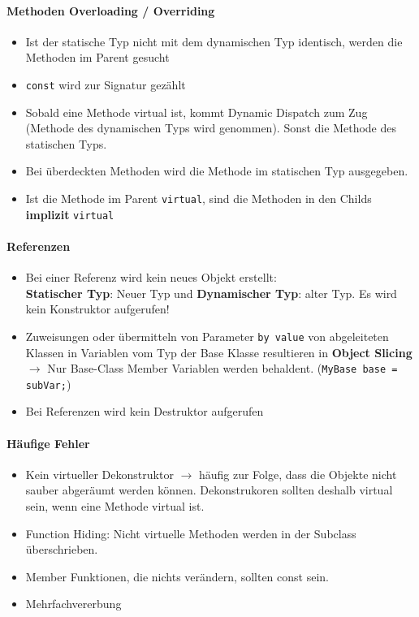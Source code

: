 \paragraph{Methoden Overloading / Overriding}
\begin{itemize}
	\item Ist der statische Typ nicht mit dem dynamischen Typ identisch, werden die Methoden im Parent gesucht
	\item \lstinline|const| wird zur Signatur gezählt
	\item Sobald eine Methode virtual ist, kommt Dynamic Dispatch zum Zug (Methode des dynamischen Typs wird genommen). Sonst die Methode des statischen Typs.
	\item Bei überdeckten Methoden wird die Methode im statischen Typ ausgegeben.
	\item Ist die Methode im Parent \lstinline|virtual|, sind die Methoden in den Childs \textbf{implizit} \lstinline|virtual|
\end{itemize}

\paragraph{Referenzen}
\begin{itemize}
	\item Bei einer Referenz wird kein neues Objekt erstellt: \\ \textbf{Statischer Typ}: Neuer Typ und \textbf{Dynamischer Typ}: alter Typ. Es wird kein Konstruktor aufgerufen!
	\item Zuweisungen oder übermitteln von Parameter \lstinline|by value| von abgeleiteten Klassen in Variablen vom Typ der Base Klasse resultieren in \textbf{Object Slicing} \\ $\rightarrow$ Nur Base-Class Member Variablen werden behaldent. (\lstinline|MyBase base = subVar;|)	
	\item Bei Referenzen wird kein Destruktor aufgerufen	
\end{itemize}

\paragraph{Häufige Fehler}
\begin{itemize}
	\item Kein	virtueller Dekonstruktor $\rightarrow$ häufig	zur	Folge, dass die Objekte nicht sauber abgeräumt werden können. Dekonstrukoren sollten deshalb virtual sein, wenn eine Methode virtual ist.
	\item Function Hiding: Nicht virtuelle Methoden werden in der Subclass überschrieben.
	\item Member Funktionen, die nichts verändern, sollten const sein.
	\item Mehrfachvererbung 
\end{itemize}

